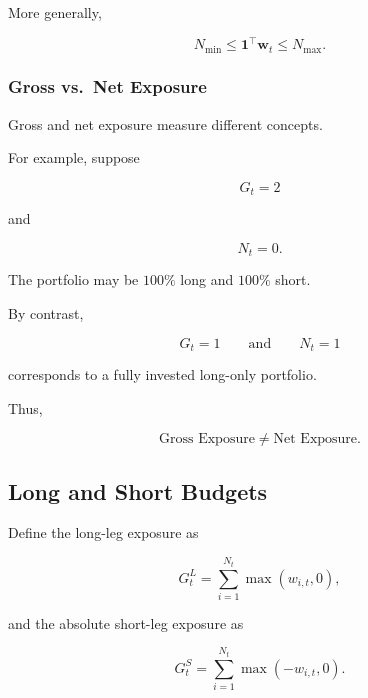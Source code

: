 \documentclass[11pt,a4paper]{article}
\begin{document}
More generally,

\begin{equation}
N_{\min}
\leq
\mathbf{1}^{\top}\mathbf{w}_t
\leq
N_{\max}.
\end{equation}


\subsubsection{Gross vs.\ Net Exposure}

Gross and net exposure measure different concepts.

For example, suppose

\begin{equation}
G_t=2
\end{equation}

and

\begin{equation}
N_t=0.
\end{equation}

The portfolio may be $100\%$ long and $100\%$ short.

By contrast,

\begin{equation}
G_t=1
\qquad
\text{and}
\qquad
N_t=1
\end{equation}

corresponds to a fully invested long-only portfolio.

Thus,

\begin{equation}
\boxed{
\text{Gross Exposure}
\neq
\text{Net Exposure}.
}
\end{equation}


\subsection{Long and Short Budgets}
\label{subsec:long_short_budgets}

Define the long-leg exposure as

\begin{equation}
\boxed{
G_t^{L}
=
\sum_{i=1}^{N_t}
\max(w_{i,t},0),
}
\end{equation}

and the absolute short-leg exposure as

\begin{equation}
\boxed{
G_t^{S}
=
\sum_{i=1}^{N_t}
\max(-w_{i,t},0).
}
\end{equation}
\end{document}
